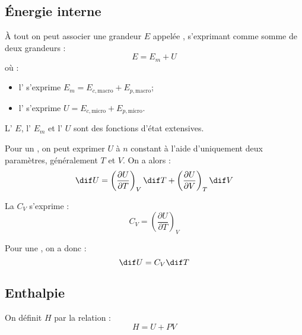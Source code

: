 \subsection{Énergie interne}

\begin{definition}
À tout  on peut associer une grandeur $E$ appelée , s'exprimant comme somme de deux grandeurs :
\[E = E_m + U\]
où :
\begin{itemize}
\item l' s'exprime $E_m = E_{c, \mathrm{macro}} + E_{p, \mathrm{macro}}$;
\item l' s'exprime $U = E_{c, \mathrm{micro}} + E_{p, \mathrm{micro}}$.
\end{itemize}
\end{definition}

\begin{propriete}[admis]
L' $E$, l' $E_m$ et l' $U$ sont des fonctions d'état extensives.
\end{propriete}

\begin{propriete}
Pour un , on peut exprimer $U$ à $n$ constant à l'aide d'uniquement deux paramètres, généralement $T$ et $V$. On a alors :
\[\dif U = \left(\frac{\partial U}{\partial T}\right)_V \dif T + \left(\frac{\partial U}{\partial V}\right)_T \dif V\]
\end{propriete}

\begin{definition}
La  $C_V$ s'exprime :
\[C_V = \left(\frac{\partial U}{\partial T}\right)_V\]
\end{definition}

\begin{remarque}
Pour une , on a donc :
\[\dif U = C_V \dif T\]
\end{remarque}



\subsection{Enthalpie}

\begin{definition}
On définit  $H$ par la relation :
\[H = U + PV\]
\end{definition}

